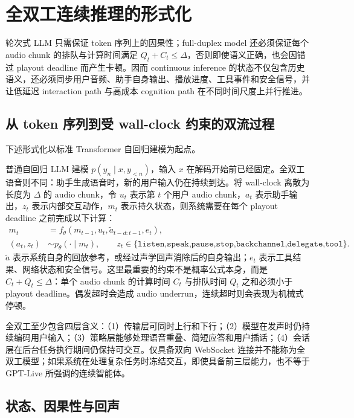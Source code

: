 \documentclass[UTF8,fontset=none,a4paper,10pt]{ctexart}
\begin{document}
\section{全双工连续推理的形式化}

轮次式 LLM 只需保证 token 序列上的因果性；full-duplex model 还必须保证每个 audio chunk 的排队与计算时间满足 $Q_t+C_t\leq\Delta$，否则即使语义正确，也会因错过 playout deadline 而产生卡顿。因而 continuous inference 的状态不仅包含历史语义，还必须同步用户音频、助手自身输出、播放进度、工具事件和安全信号，并让低延迟 interaction path 与高成本 cognition path 在不同时间尺度上并行推进。

\subsection{从 token 序列到受 wall-clock 约束的双流过程}

下述形式化以标准 Transformer 自回归建模为起点\cite{zh:vaswani2017attention}。

普通自回归 LLM 建模 $p(y_n\mid x,y_{<n})$，输入 $x$ 在解码开始前已经固定。全双工语音则不同：助手生成语音时，新的用户输入仍在持续到达。将 wall-clock 离散为长度为 $\Delta$ 的 audio chunk，令 $u_t$ 表示第 $t$ 个用户 audio chunk，$a_t$ 表示助手输出，$z_t$ 表示内部交互动作，$m_t$ 表示持久状态，则系统需要在每个 playout deadline 之前完成以下计算：
\begin{align}
m_t &= f_\theta(m_{t-1},u_t,\tilde a_{t-d:t-1},e_t),\\
(a_t,z_t) &\sim p_\theta(\cdot\mid m_t),\qquad
z_t\in\{\texttt{listen,speak,pause,stop,backchannel,delegate,tool}\}.
\end{align}
$\tilde a$ 表示系统自身的回放参考，或经过声学回声消除后的自身输出；$e_t$ 表示工具结果、网络状态和安全信号。这里最重要的约束不是概率公式本身，而是 $C_t+Q_t\leq\Delta$：单个 audio chunk 的计算时间 $C_t$ 与排队时间 $Q_t$ 之和必须小于 playout deadline。偶发超时会造成 audio underrun，连续超时则会表现为机械式停顿。

全双工至少包含四层含义：（1）传输层可同时上行和下行；（2）模型在发声时仍持续编码用户输入；（3）策略层能够处理语音重叠、简短应答和用户插话；（4）会话层在后台任务执行期间仍保持可交互。仅具备双向 WebSocket 连接并不能称为全双工模型；如果系统在处理复杂任务时冻结交互，即使具备前三层能力，也不等于 GPT-Live 所强调的连续智能体。

\subsection{状态、因果性与回声}
\end{document}
